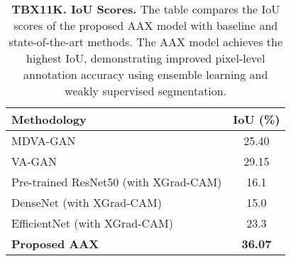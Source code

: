 
\begin{table}[!h]
\centering
\caption{\textbf{TBX11K. IoU Scores.} The table compares the IoU scores of the proposed AAX model with baseline and state-of-the-art methods. The AAX model achieves the highest IoU, demonstrating improved pixel-level annotation accuracy using ensemble learning and weakly supervised segmentation.}
\label{tab:iou_performance_tbx}
\begin{tabular}{@{}lc@{}}
\toprule
\textbf{Methodology} & \textbf{IoU (\%)} \\ \midrule
MDVA-GAN \cite{ref30} & 25.40 \\
VA-GAN \cite{ref24} & 29.15 \\
Pre-trained ResNet50 (with XGrad-CAM) & 16.1 \\
DenseNet (with XGrad-CAM) & 15.0 \\
EfficientNet (with XGrad-CAM) & 23.3 \\
\textbf{Proposed AAX} & \textbf{36.07} \\ \bottomrule
\end{tabular}
\end{table}